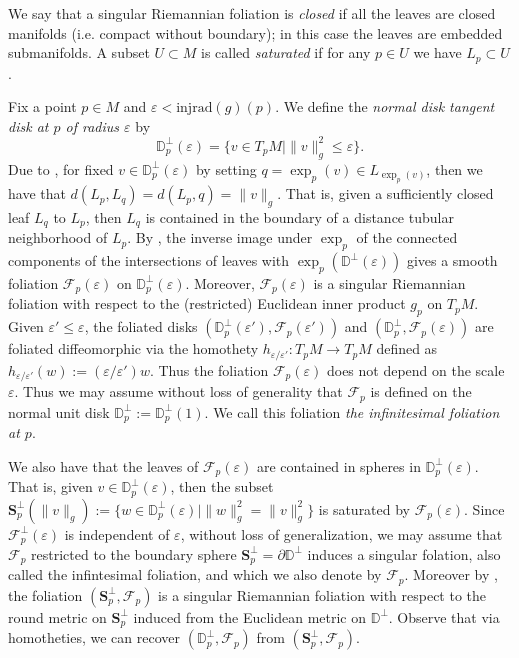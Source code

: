 \documentclass[12pt,a4paper,reqno]{amsart}
\newcommand{\1}{\mathbbm{1}} %
\newcommand{\D}{\mathbb{D}} %
\newcommand{\fol}{\mathcal{F}} %
\newcommand{\Sp}{\mathbf{S}} %
\theoremstyle{definition}
\theoremstyle{TheoremNum}
\begin{document}
We say that a singular Riemannian foliation is \emph{closed} if all the leaves are closed manifolds (i.e. compact without boundary); in this case the leaves are embedded submanifolds. A subset $U\subset M$ is called \emph{saturated} if for any $p\in U$ we have $L_p\subset U$.

Fix a point $p\in M$ and $\varepsilon<\mathrm{injrad}(g)(p)$. We define  the \emph{normal disk tangent disk at $p$ of radius $\varepsilon$} by  
\[
\D^\perp_p (\varepsilon) = \{v\in T_p M\mid \|v\|^2_g\leq \varepsilon\}.
\]
Due to \cite{Molino}, for fixed $v\in \D^\perp_p (\varepsilon)$ by setting $q = \exp_p(v)\in L_{\exp_p(v)}$, then we have that $d(L_p,L_q) = d(L_p,q)=\|v\|_g$. That is, given a sufficiently closed leaf $L_q$ to $L_p$, then $L_q$ is contained in the boundary of a distance tubular neighborhood of $L_p$. By \cite{Molino}, the inverse image under $\exp_p$ of the connected components of the intersections of leaves with $\exp_p(\D^\perp(\varepsilon))$ gives a smooth foliation $\fol_p(\varepsilon)$ on $\D^\perp_p(\varepsilon)$. Moreover, $\fol_p(\varepsilon)$ is a singular Riemannian foliation with respect to the (restricted) Euclidean inner product $g_p$ on $T_p M$. Given $\varepsilon'\leq \varepsilon$, the foliated disks $(\D^\perp_p(\varepsilon'),\fol_p(\varepsilon'))$ and $(\D^\perp_p,\fol_p(\varepsilon))$ are foliated diffeomorphic via the homothety $h_{\varepsilon/\varepsilon'}\colon T_p M\to T_p M$ defined as $h_{\varepsilon/\varepsilon'}(w) := (\varepsilon/\varepsilon') w$. Thus the foliation $\fol_p(\varepsilon)$ does not depend on the scale $\varepsilon$. Thus we may assume without loss of generality that $\fol_p$ is defined on the normal unit disk $\D^\perp_p:=\D^\perp_p(1)$. We call this foliation \emph{the infinitesimal foliation at $p$}.

We also have that the leaves of $\fol_p(\varepsilon)$ are contained in spheres in $\D^\perp_p(\varepsilon)$. That is, given $v\in \D^\perp_p(\varepsilon)$, then the subset $\Sp^\perp_p(\|v\|_{g}) := \{w\in \D^\perp_p(\varepsilon)\mid \|w\|^2_{g}= \|v\|^2_{g}\}$ is saturated by $\fol_p(\varepsilon)$. Since $\fol_p^\perp(\varepsilon)$ is independent of $\varepsilon$, without loss of generalization, we may assume that $\fol_p$ restricted to the boundary sphere $\Sp^\perp_p=\partial \D^\perp$ induces a singular folation,  also called the infintesimal foliation, and which we also denote by $\fol_p$. Moreover by \cite{Molino}, the foliation $(\Sp^\perp_p,\fol_p)$ is a singular Riemannian foliation with respect to the round metric on $\Sp^\perp_p$ induced from the Euclidean metric on $\D^\perp$. Observe that via homotheties, we can recover $(\D^\perp_p,\fol_p)$ from $(\Sp^\perp_p,\fol_p)$.
\end{document}
